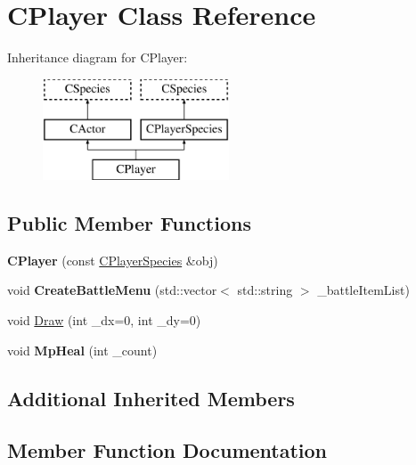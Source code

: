 \hypertarget{class_c_player}{}\section{C\+Player Class Reference}
\label{class_c_player}
Inheritance diagram for C\+Player\+:\begin{figure}[H]
\begin{center}
\leavevmode
\includegraphics[height=3.000000cm]{class_c_player}
\end{center}
\end{figure}
\subsection*{Public Member Functions}
\begin{DoxyCompactItemize}
\item 
{\bfseries C\+Player} (const \hyperlink{class_c_player_species}{C\+Player\+Species} \&obj)\hypertarget{class_c_player_aa26b603893b75ea41882ea9faaa03978}{}\label{class_c_player_aa26b603893b75ea41882ea9faaa03978}

\item 
void {\bfseries Create\+Battle\+Menu} (std\+::vector$<$ std\+::string $>$ \+\_\+battle\+Item\+List)\hypertarget{class_c_player_a0d8f2a1b9b78c52bf7bae019079088ef}{}\label{class_c_player_a0d8f2a1b9b78c52bf7bae019079088ef}

\item 
void \hyperlink{class_c_player_a35f11b073c55586f3ef7b4eba4e82e27}{Draw} (int \+\_\+dx=0, int \+\_\+dy=0)
\item 
void {\bfseries Mp\+Heal} (int \+\_\+count)\hypertarget{class_c_player_a6889c018e8641105df56f21af8d1f5cb}{}\label{class_c_player_a6889c018e8641105df56f21af8d1f5cb}

\end{DoxyCompactItemize}
\subsection*{Additional Inherited Members}


\subsection{Member Function Documentation}
